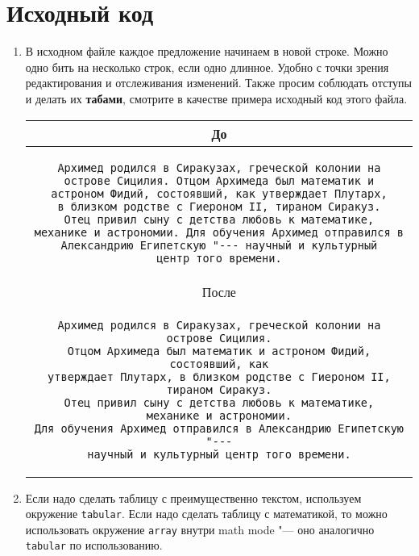 \documentclass[12pt,a4paper]{book}
\begin{document}
\section{Исходный код}

\begin{enumerate}
\item
	В исходном файле каждое предложение начинаем в новой строке.
	Можно одно бить на несколько строк, если одно длинное.
	Удобно с точки зрения редактирования и отслеживания изменений.
	Также просим соблюдать отступы и делать их \textbf{табами}, смотрите в качестве примера исходный код этого файла.

	\begin{center}\begin{tabular}{|c|}
	\hline
	До \\
	\hline
	\begin{minipage}{0.9\textwidth}
		\begin{verbatim}
Архимед родился в Сиракузах, греческой колонии на
острове Сицилия. Отцом Архимеда был математик и
астроном Фидий, состоявший, как утверждает Плутарх,
в близком родстве с Гиероном II, тираном Сиракуз.
Отец привил сыну с детства любовь к математике,
механике и астрономии. Для обучения Архимед отправился в
Александрию Египетскую "--- научный и культурный
центр того времени.
\end{verbatim}
	\end{minipage}
	\\
	\hline После \\
	\hline
	\begin{minipage}{0.9\textwidth}
		\begin{verbatim}
Архимед родился в Сиракузах, греческой колонии на острове Сицилия.
Отцом Архимеда был математик и астроном Фидий, состоявший, как
утверждает Плутарх, в близком родстве с Гиероном II, тираном Сиракуз.
Отец привил сыну с детства любовь к математике,
механике и астрономии.
Для обучения Архимед отправился в Александрию Египетскую "---
научный и культурный центр того времени.
\end{verbatim}
	\end{minipage} \\
	\hline
	\end{tabular}\end{center}

\item
	Если надо сделать таблицу с преимущественно текстом, используем окружение \texttt{tabular}.
	Если надо сделать таблицу с математикой, то можно использовать окружение \texttt{array}
	внутри math mode "--- оно аналогично \texttt{tabular} по использованию.

\end{enumerate}
\end{document}
